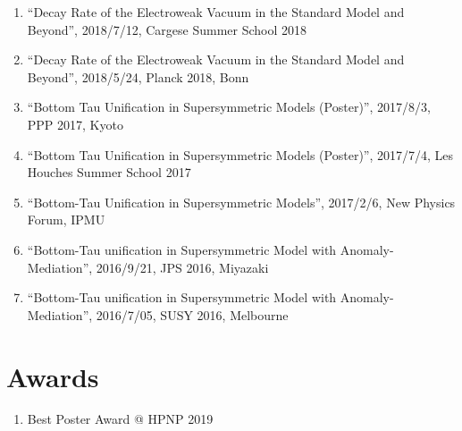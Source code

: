 \documentclass[12pt]{article}
\begin{document}
\begin{enumerate}
 \item ``Decay Rate of the Electroweak Vacuum in the Standard Model and Beyond'', 2018/7/12, Cargese Summer School 2018
 \item ``Decay Rate of the Electroweak Vacuum in the Standard Model and Beyond'', 2018/5/24, Planck 2018, Bonn
 \item ``Bottom Tau Unification in Supersymmetric Models (Poster)'', 2017/8/3, PPP 2017, Kyoto
 \item ``Bottom Tau Unification in Supersymmetric Models (Poster)'', 2017/7/4, Les Houches Summer School 2017
 \item ``Bottom-Tau Unification in Supersymmetric Models'', 2017/2/6, New Physics Forum, IPMU
 \item ``Bottom-Tau unification in Supersymmetric Model with Anomaly-Mediation'', 2016/9/21, JPS 2016, Miyazaki
 \item ``Bottom-Tau unification in Supersymmetric Model with Anomaly-Mediation'', 2016/7/05, SUSY 2016, Melbourne
\end{enumerate}

\section*{Awards}

\begin{enumerate}
 \item Best Poster Award @ HPNP 2019
\end{enumerate}
\end{document}
